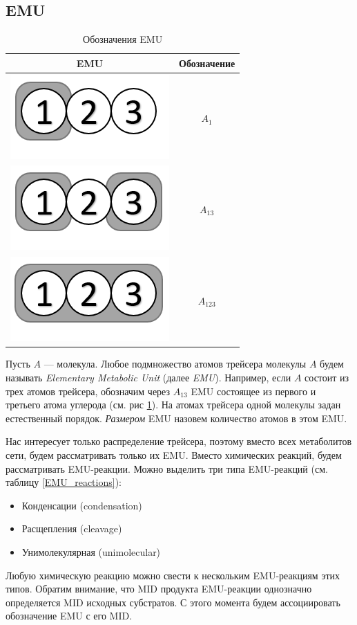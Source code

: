 \documentclass[14pt, a4paper]{extreport}
\begin{document}
\subsection{EMU}

\begin{table}
	\begin{tabular}{c | c}
		EMU & Обозначение\\
		\hline
		\includegraphics[scale=0.6]{emus/EMUA1.png} & $A_1$\\
		\hline
		\includegraphics[scale=0.6]{emus/EMU13.png} & $A_{13}$\\
		\hline
		\includegraphics[scale=0.6]{emus/EMU123.png} & $A_{123}$\\
	\end{tabular}
	\caption{Обозначения EMU}
	\label{EMU}
\end{table}

Пусть $A$ --- молекула. Любое подмножество атомов трейсера молекулы $A$ будем называть \emph{Elementary Metabolic Unit} (далее \emph{EMU}). Например, если $A$ состоит из трех атомов трейсера, обозначим через $A_{13}$ EMU состоящее из первого и третьего атома углерода (см. рис \ref{EMU}). На атомах трейсера одной молекулы задан естественный порядок. \emph{Размером} EMU назовем количество атомов в этом EMU.

Нас интересует только распределение трейсера, поэтому вместо всех метаболитов сети, будем рассматривать только их EMU. Вместо химических реакций, будем рассматривать EMU-реакции. Можно выделить три типа EMU-реакций (см. таблицу \ref{EMU_reactions}):
\begin{itemize}
	\item Конденсации (condensation)
	\item Расщепления (cleavage)
	\item Унимолекулярная (unimolecular)
\end{itemize}
Любую химическую реакцию можно свести к нескольким EMU-реакциям этих типов. Обратим внимание, что MID продукта EMU-реакции однозначно определяется MID исходных субстратов. С этого момента будем ассоциировать обозначение EMU с его MID.
\clearpage
\end{document}
